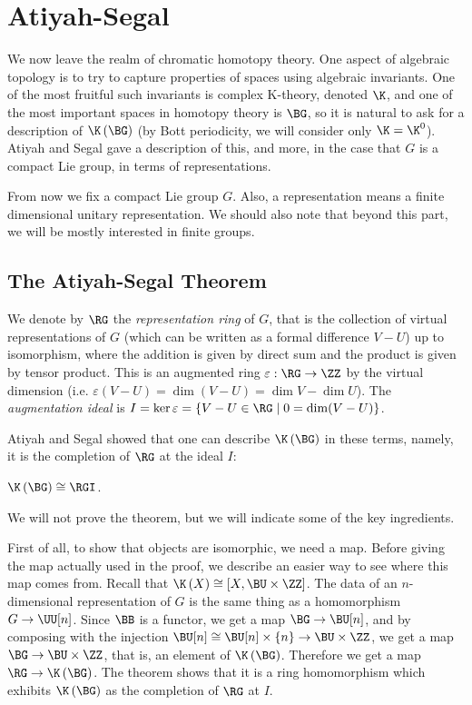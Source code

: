 \section{Atiyah-Segal}

We now leave the realm of chromatic homotopy theory.
One aspect of algebraic topology is to try to capture properties of spaces using algebraic invariants.
One of the most fruitful such invariants is complex K-theory, denoted $\K$, and one of the most important spaces in homotopy theory is $\BG$, so it is natural to ask for a description of $\K\left(\BG\right)$ (by Bott periodicity, we will consider only $\K = \K^0$).
Atiyah and Segal \cite{AS} gave a description of this, and more, in the case that $G$ is a compact Lie group, in terms of representations.

From now we fix a compact Lie group $G$.
Also, a representation means a finite dimensional unitary representation.
We should also note that beyond this part, we will be mostly interested in finite groups.



\subsection{The Atiyah-Segal Theorem}

We denote by $\RG$ the \emph{representation ring} of $G$, that is the collection of virtual representations of $G$ (which can be written as a formal difference $V - U$) up to isomorphism, where the addition is given by direct sum and the product is given by tensor product.
This is an augmented ring $\varepsilon: \RG \to \ZZ$ by the virtual dimension (i.e. $\varepsilon\left(V-U\right) = \dim\left(V-U\right) = \dim V - \dim U$).
The \emph{augmentation ideal} is $I = \ker \varepsilon = \left\{ V - U \in \RG \mid 0 = \dim(V-U) \right\}$.

Atiyah and Segal showed that one can describe $\K\left(\BG\right)$ in these terms, namely, it is the completion of $\RG$ at the ideal $I$:

\begin{theorem}[{\cite{AS}}]\label{AS-private}
	$\K\left(\BG\right) \cong \RGI$.
\end{theorem}

We will not prove the theorem, but we will indicate some of the key ingredients.

First of all, to show that objects are isomorphic, we need a map.
Before giving the map actually used in the proof, we describe an easier way to see where this map comes from.
Recall that $\K\left(X\right) \cong \left[X, \BU \times \ZZ\right]$.
The data of an $n$-dimensional representation of $G$ is the same thing as a homomorphism $G \to \UU[n]$.
Since $\BB$ is a functor, we get a map $\BG \to \BU[n]$, and by composing with the injection $\BU[n] \cong \BU[n] \times \left\{n\right\} \to \BU \times \ZZ$, we get a map $\BG \to \BU \times \ZZ$, that is, an element of $\K\left(\BG\right)$.
Therefore we get a map $\RG \to \K\left(\BG\right)$.
The theorem shows that it is a ring homomorphism which exhibits $\K\left(\BG\right)$ as the completion of $\RG$ at $I$.

